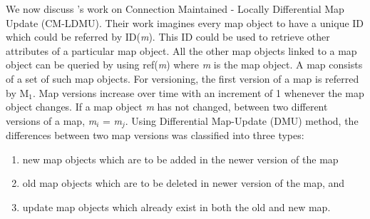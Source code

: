 We now discuss \citet{asahara2008locally}'s work on Connection Maintained - Locally Differential Map Update (CM-LDMU). Their work imagines every map object to have a unique ID which could be referred by ID(\textit{m}). This ID could be used to retrieve other attributes of a particular map object. All the other map objects linked to a map object can be queried by using ref(\textit{m}) where \textit{m} is the map object. A map consists of a set of such map objects. For versioning, the first version of a map is referred by M$_{1}$. Map versions increase over time with an increment of 1 whenever the map object changes. If a map object \textit{m} has not changed, between two different versions of a map, \textit{m}$_{i}$ = \textit{m}$_{j}$. Using Differential Map-Update (DMU) method, the differences between two map versions was classified into three types: 
\begin{enumerate}
\item new map objects which are to be added in the newer version of the map
\item old map objects which are to be deleted in newer version of the map, and 
\item update map objects which already exist in both the old and new map.
\end{enumerate}
